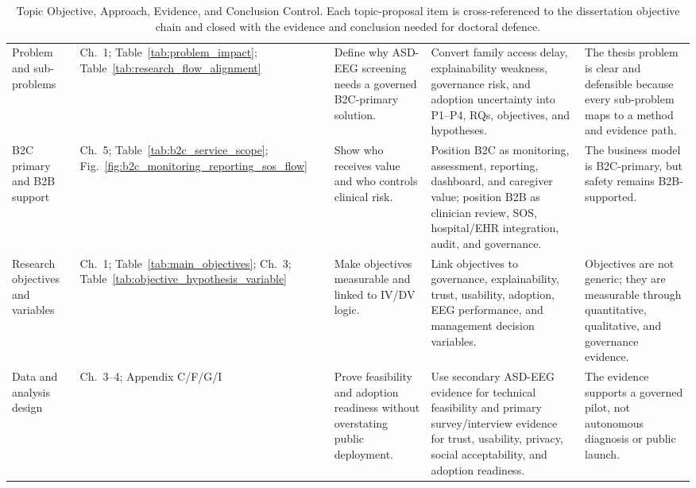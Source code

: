 {\tablestripes\tablefontsize
{}
\begin{xltabular}{\textwidth}{@{} >{\raggedright\arraybackslash}p{2.0cm} p{2.0cm} p{2.8cm} p{4.3cm} >{\raggedright\arraybackslash}p{3.1cm} @{}}
\caption[Topic Objective, Approach, Evidence, and Conclusion Control]{Topic Objective, Approach, Evidence, and Conclusion Control. Each topic-proposal item is cross-referenced to the dissertation objective chain and closed with the evidence and conclusion needed for doctoral defence.}\label{tab:topic_objective_achievement_control} \\
\toprule
{} &  &  &  &  \\
\midrule
\endfirsthead
\endhead
\bottomrule
\endlastfoot
Problem and sub-problems & Ch.~1; Table~\ref{tab:problem_impact}; Table~\ref{tab:research_flow_alignment} & Define why ASD-EEG screening needs a governed B2C-primary solution. & Convert family access delay, explainability weakness, governance risk, and adoption uncertainty into P1--P4, RQs, objectives, and hypotheses. & The thesis problem is clear and defensible because every sub-problem maps to a method and evidence path. \\
\addlinespace
B2C primary and B2B support & Ch.~5; Table~\ref{tab:b2c_service_scope}; Fig.~\ref{fig:b2c_monitoring_reporting_sos_flow} & Show who receives value and who controls clinical risk. & Position B2C as monitoring, assessment, reporting, dashboard, and caregiver value; position B2B as clinician review, SOS, hospital/EHR integration, audit, and governance. & The business model is B2C-primary, but safety remains B2B-supported. \\
\addlinespace
Research objectives and variables & Ch.~1; Table~\ref{tab:main_objectives}; Ch.~3; Table~\ref{tab:objective_hypothesis_variable} & Make objectives measurable and linked to IV/DV logic. & Link objectives to governance, explainability, trust, usability, adoption, EEG performance, and management decision variables. & Objectives are not generic; they are measurable through quantitative, qualitative, and governance evidence. \\
\addlinespace
Data and analysis design & Ch.~3--4; Appendix C/F/G/I & Prove feasibility and adoption readiness without overstating public deployment. & Use secondary ASD-EEG evidence for technical feasibility and primary survey/interview evidence for trust, usability, privacy, social acceptability, and adoption readiness. & The evidence supports a governed pilot, not autonomous diagnosis or public launch. \\

\end{xltabular}}
